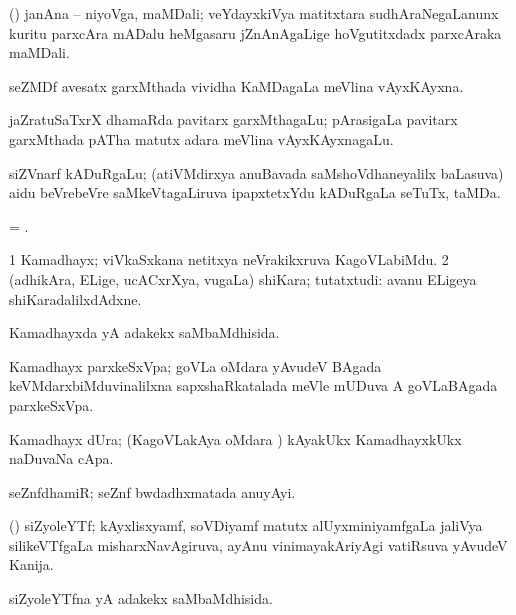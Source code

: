 \noindent
\gl{\pagu} 
\bmng
{}  (\ca) janAna -- niyoVga, maMDali; veYdayxkiVya matitxtara sudhAraNegaLanunx kuritu parxcAra mADalu heMgasaru jZnAnAgaLige hoVgutitxdadx parxcAraka maMDali.
\emng
\eentry

\bentry
{} 
\gl{\nA} 
\bmng
seZMDf avesatx garxMthada vividha KaMDagaLa meVlina vAyxKAyxna.
\emng
\eentry

\bentry
{} 
\gl{\nA}
\bmng
jaZratuSaTxrX  dhamaRda pavitarx  garxMthagaLu; pArasigaLa pavitarx garxMthada pATha matutx adara meVlina vAyxKAyxnagaLu.
\emng
\eentry

\bentry
{}  
\gl{\nA}
\bmng
siZVnarf kADuRgaLu; (atiVMdirxya anuBavada saMshoVdhaneyalilx baLasuva) aidu beVrebeVre saMkeVtagaLiruva  ipapxtetxYdu  kADuRgaLa  seTuTx, taMDa.
\emng
\eentry

\bentry
{} 
\gl{\nA}
\bmng
= .
\emng
\eentry

\bentry
{} 
\gl{\nA} 
\bmng
\bnum
\num{1} Kamadhayx; viVkaSxkana netitxya neVrakikxruva KagoVLabiMdu. 
\num{2} (adhikAra, ELige, ucACxrXya, \mo vugaLa) shiKara; tutatxtudi:  avanu ELigeya shiKaradalilxdAdxne.
\enum
\emng
\eentry

\bentry
{} 
\gl{\gu} 
\bmng
Kamadhayxda yA adakekx saMbaMdhisida.
\emng
\eentry

\bentry
{}  
\gl{\nA} 
\bmng
Kamadhayx parxkeSxVpa; goVLa oMdara yAvudeV BAgada keVMdarxbiMduvinalilxna sapxshaRkatalada meVle mUDuva A goVLaBAgada parxkeSxVpa.
\emng
\eentry

\bentry
{}  
\gl{\nA} 
\bmng
Kamadhayx dUra; (KagoVLakAya oMdara \vi) kAyakUkx KamadhayxkUkx naDuvaNa cApa.
\emng
\eentry

\bentry
{} 
\gl{\nA} 
\bmng
seZnfdhamiR;  seZnf bwdadhxmatada anuyAyi.
\emng
\eentry

\bentry
{} 
\gl{\nA} 
\bmng
(\BUvi) siZyoleYTf; kAyxlisxyamf, soVDiyamf matutx alUyxminiyamfgaLa jaliVya silikeVTfgaLa misharxNavAgiruva, ayAnu vinimayakAriyAgi vatiRsuva yAvudeV Kanija.
\emng
\eentry

\bentry
{} 
\gl{\gu} 
\bmng
siZyoleYTfna yA adakekx saMbaMdhisida.
\emng
\eentry


